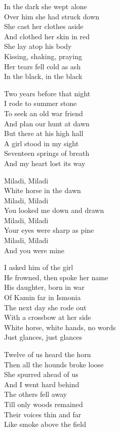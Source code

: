 \begin{lyrics}
In the dark she wept alone\\
Over him she had struck down\\
She cast her clothes aside\\
And clothed her skin in red\\
She lay atop his body\\
Kissing, shaking, praying\\
Her tears fell cold as ash\\
In the black, in the black

Two years before that night\\
I rode to summer stone\\
To seek an old war friend\\
And plan our hunt at dawn\\
But there at his high hall\\
A girl stood in my sight\\
Seventeen springs of breath\\
And my heart lost its way

Miladi, Miladi\\
White horse in the dawn\\
Miladi, Miladi\\
You looked me down and drawn\\
Miladi, Miladi\\
Your eyes were sharp as pine\\
Miladi, Miladi\\
And you were mine

I asked him of the girl\\
He frowned, then spoke her name\\
His daughter, born in war\\
Of Kamin far in Ismonia\\
The next day she rode out\\
With a crossbow at her side\\
White horse, white hands, no words\\
Just glances, just glances

Twelve of us heard the horn\\
Then all the hounds broke loose\\
She spurred ahead of us\\
And I went hard behind\\
The others fell away\\
Till only woods remained\\
Their voices thin and far\\
Like smoke above the field


\end{lyrics}
